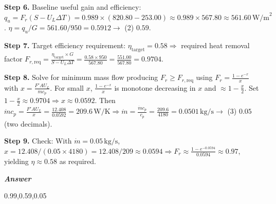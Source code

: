 \begin{tcolorbox}[
    breakable,
    title=Example of Scientific Deep Research in Energy,
    colback=LighterGray,
    colframe=DeepPurple,
    colbacktitle=DeepPurple,
    coltitle=White,
]
\textbf{\textcolor{CaseOrange}{Step 6.}} Baseline useful gain and efficiency: \( q_u = F_r (S - U_L \Delta T) = 0.989 \times (820.80 - 253.00) \approx 0.989 \times 567.80 \approx 561.60\,\mathrm{W/m}^2 \). \( \eta = q_u/G = 561.60/950 = 0.5912 \rightarrow \) (2) \( 0.59 \).

\textbf{\textcolor{CaseOrange}{Step 7.}} Target efficiency requirement: \( \eta_\mathrm{target} = 0.58 \Rightarrow \) required heat removal factor \( F_{r,\mathrm{req}} = \frac{\eta_\mathrm{target} \times G}{S - U_L \Delta T} = \frac{0.58 \times 950}{567.80} = \frac{551.00}{567.80} = 0.9704 \).

\textbf{\textcolor{CaseOrange}{Step 8.}} Solve for minimum mass flow producing \( F_r \geq F_{r,\mathrm{req}} \) using \( F_r = \frac{1 - e^{-x}}{x} \) with \( x = \frac{F' A U_L}{\dot{m} c_p} \). For small \( x \), \( \frac{1 - e^{-x}}{x} \) is monotone decreasing in \( x \) and \( \approx 1 - \frac{x}{2} \). Set \( 1 - \frac{x}{2} \approx 0.9704 \Rightarrow x \approx 0.0592 \). Then \( \dot{m} c_p = \frac{F' A U_L}{x} = \frac{12.408}{0.0592} = 209.6\,\mathrm{W/K} \Rightarrow \dot{m} = \frac{\dot{m} c_p}{c_p} = \frac{209.6}{4180} = 0.0501\,\mathrm{kg/s} \rightarrow \) (3) \( 0.05 \) (two decimals).

\textbf{\textcolor{CaseOrange}{Step 9.}} Check: With \( \dot{m} = 0.05\,\mathrm{kg/s} \), \( x = 12.408/(0.05 \times 4180) = 12.408/209 \approx 0.0594 \Rightarrow F_r \approx \frac{1-e^{-0.0594}}{0.0594} \approx 0.97 \), yielding \( \eta \approx 0.58 \) as required.


\textbf{\emph{\textcolor{DeepPurple}{Answer}}}

0.99,0.59,0.05

\end{tcolorbox}

